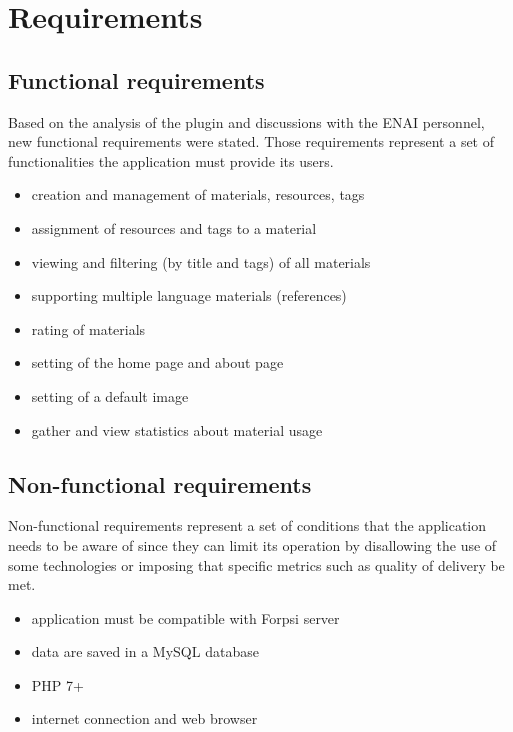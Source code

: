 \documentclass[
  digital,     %
  oneside,     %
  nosansbold,  %
  colorbold, %
  lof,         %
  lot,         %
]{fithesis4}
\begin{document}
\section{Requirements}

\subsection{Functional requirements}

Based on the analysis of the plugin and discussions with the ENAI personnel, new functional
requirements were stated. Those requirements represent a set of functionalities the application
must provide its users.

\begin{itemize}
    \item creation and management of materials, resources, tags
    \item assignment of resources and tags to a material
    \item viewing and filtering (by title and tags) of all materials
    \item supporting multiple language materials (references)
    \item rating of materials
    \item setting of the home page and about page
    \item setting of a default image
    \item gather and view statistics about material usage
\end{itemize}

\subsection{Non-functional requirements}

Non-functional requirements represent a set of conditions that the application needs to be aware of
since they can limit its operation by disallowing the use of some technologies or imposing that
specific metrics such as quality of delivery be met.

\begin{itemize}
	\item application must be compatible with Forpsi server~\cite{forpsi_data}
	\item data are saved in a MySQL database
	\item PHP 7+
	\item internet connection and web browser
\end{itemize}
\end{document}

